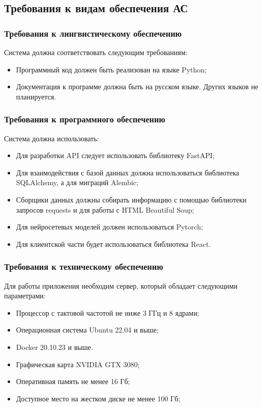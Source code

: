 {\subsection{Требования к видам обеспечения АС}
\subsubsection{Требования к лингвистическому обеспечению}
Система должна соответствовать следующим требованиям:
\begin{itemize}
  \item Программный код должен быть реализован на языке Python;
  \item Документация к программе должна быть на русском языке. Других языков не планируется.
\end{itemize}
\subsubsection{Требования к программного обеспечению}
Система должна использовать:
\begin{itemize}
  \item Для разработки API следует использовать библиотеку FastAPI;
  \item Для взаимодействия с базой данных должна использоваться библиотека SQLAlchemy, а для миграций Alembic;
  \item Сборщики данных должны собирать информацию с помощью библиотеки запросов
        requests и для работы с HTML Beautiful Soup;
  \item Для нейросетевых моделей должен использоваться Pytorch;
  \item Для клиентской части будет использоваться библиотека React.
\end{itemize}
\subsubsection{Требования к техническому обеспечению}
Для работы приложения необходим сервер, который обладает следующими параметрами:
\begin{itemize}
  \item Процессор с тактовой частотой не ниже 3 ГГц и 8 ядрами;
  \item Операционная система Ubuntu 22.04 и выше;
  \item Docker 20.10.23 и выше.
  \item Графическая карта NVIDIA GTX 3080;
  \item Оперативная память не менее 16 Гб;
  \item Доступное место на жестком диске не менее 100 Гб;
\end{itemize}
}
